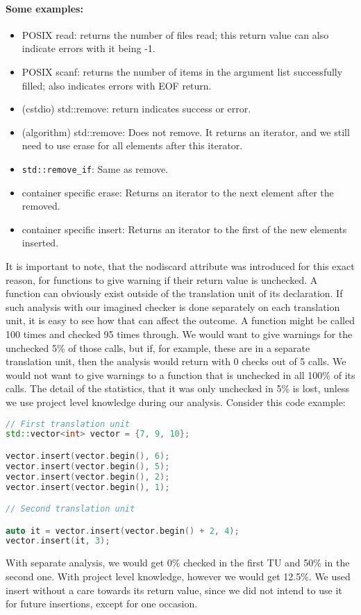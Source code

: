 \paragraph{Some examples:}
\begin{itemize}
	\item POSIX read: returns the number of files read; this return value can also indicate errors with it being -1.
	\item POSIX scanf: returns the number of items in the argument list successfully filled; also indicates errors with EOF return.
	\item (cstdio) std::remove: return indicates success or error.
	\item (algorithm) std::remove: Does not remove. It returns an iterator, and we still need to use erase for all elements after this iterator.
	\item \texttt{std::remove\_if}: Same as remove.
	\item container specific erase: Returns an iterator to the next element after the removed. 
	\item container specific insert: Returns an iterator to the first of the new elements inserted.
\end{itemize}
It is important to note, that the nodiscard attribute was introduced for this exact reason, for functions to give warning if their
return value is unchecked.
A function can obviously exist outside of the translation unit of its declaration. If such analysis with our imagined checker is done
separately on each translation unit, it is easy to see how that can affect the outcome. A function might be called 100 times and 
checked 95 times through. We would want to give warnings for the unchecked 5\% of those calls, but if, for example, these are in a 
separate translation unit, then the analysis would return with 0 checks out of 5 calls. We would not want to give warnings to a
function that is unchecked in all 100\% of its calls. The detail of the statistics, that it was only unchecked in 5\% is lost,
unless we use project level knowledge during our analysis. Consider this code example:
\begin{lstlisting}[language={C++}]
	// First translation unit
std::vector<int> vector = {7, 9, 10};

vector.insert(vector.begin(), 6);
vector.insert(vector.begin(), 5);
vector.insert(vector.begin(), 2);
vector.insert(vector.begin(), 1);

// Second translation unit

auto it = vector.insert(vector.begin() + 2, 4);
vector.insert(it, 3);
\end{lstlisting}
With separate analysis, we would get 0\% checked in the first TU and 50\% in the second one. With project level knowledge, however we
would get 12.5\%. We used insert without a care towards its return value, since we did not intend to use it for future insertions,
except for one occasion.  

